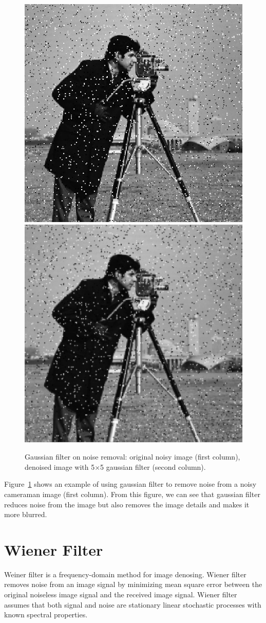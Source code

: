 \begin{figure}[tb]
\begin{center}
	\includegraphics[width=0.4\columnwidth]{images/salt_pepper_noise.jpg}
	\includegraphics[width=0.4\columnwidth]{images/salt_pepper_gaussian_55.jpg}
	\caption{Gaussian filter on noise removal: original noisy image (first column), denoised image with 5$\times$5 gaussian filter (second column).}	
	\label{fig:gaussianfilter}
\end{center}
\end{figure}

Figure~\ref{fig:gaussianfilter} shows an example of using gaussian filter to remove noise from a noisy cameraman image (first column). From this figure, we can see that gaussian filter reduces noise from the image but also removes the image details and makes it more blurred.

\section{Wiener Filter}

Weiner filter is a frequency-domain method for image denosing. Wiener filter removes noise from an image signal by minimizing mean square error between the original noiseless image signal and the received image signal. Wiener filter assumes that both signal and noise are stationary linear stochastic processes with known spectral properties.

